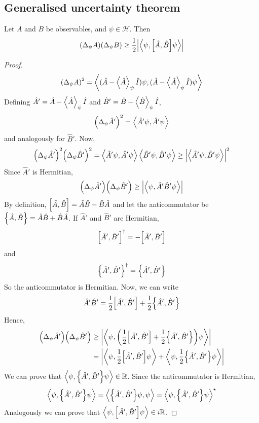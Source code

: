 \subsection{Generalised uncertainty theorem}
\begin{theorem}
	Let \( A \) and \( B \) be observables, and \( \psi \in \mathcal H \).
	Then
	\[
		\qty(\Delta_\psi A)\qty(\Delta_\psi B) \geq \frac{1}{2} \abs{\left\langle{\psi, \qty[\hat A, \hat B]\psi}\right\rangle}
	\]
\end{theorem}
\begin{proof}
	\[
		\qty(\Delta_\psi A)^2 = \left\langle{(\hat A - \left\langle{\hat A}\right\rangle_\psi \hat I) \psi, (\hat A - \left\langle{\hat A}\right\rangle_\psi \hat I) \psi}\right\rangle
	\]
	Defining \( \hat A' = \hat A - \left\langle{\hat A}\right\rangle_\psi \hat I \) and \( \hat B' = \hat B - \left\langle{\hat B}\right\rangle_\psi \hat I \),
	\[
		\qty(\Delta_\psi \hat A')^2 = \left\langle{\hat A' \psi, \hat A' \psi}\right\rangle
	\]
	and analogously for \( \hat B' \).
	Now,
	\[
		\qty(\Delta_\psi \hat A')^2 \qty(\Delta_\psi \hat B')^2 = \left\langle{\hat A' \psi, \hat A' \psi}\right\rangle \left\langle{\hat B' \psi, \hat B' \psi}\right\rangle \geq \abs{\left\langle{\hat A' \psi, \hat B' \psi}\right\rangle}^2
	\]
	Since \( \hat A' \) is Hermitian,
	\[
		\qty(\Delta_\psi \hat A') \qty(\Delta_\psi \hat B') \geq \abs{\left\langle{\psi, \hat A' \hat B' \psi}\right\rangle}
	\]
	By definition, \( \qty[\hat A, \hat B] = \hat A \hat B - \hat B \hat A \) and let the anticommutator be \( \qty{\hat A, \hat B} = \hat A \hat B + \hat B \hat A \).
	If \( \hat A' \) and \( \hat B' \) are Hermitian,
	\[
		\qty[\hat A', \hat B']^\dagger = - \qty[\hat A', \hat B']
	\]
	and
	\[
		\qty{\hat A', \hat B'}^\dagger = \qty{\hat A', \hat B'}
	\]
	So the anticommutator is Hermitian.
	Now, we can write
	\[
		\hat A' \hat B' = \frac{1}{2} \qty[\hat A', \hat B'] + \frac{1}{2} \qty{\hat A', \hat B'}
	\]
	Hence,
	\begin{align*}
		\qty(\Delta_\psi \hat A') \qty(\Delta_\psi \hat B') & \geq \abs{\left\langle{\psi, \qty(\frac{1}{2} \qty[\hat A', \hat B'] + \frac{1}{2} \qty{\hat A', \hat B'}) \psi}\right\rangle}           \\
		                                                    & = \abs{\left\langle{\psi, \frac{1}{2} \qty[\hat A', \hat B'] \psi}\right\rangle + \left\langle{\psi, \frac{1}{2} \qty{\hat A', \hat B'} \psi}\right\rangle}
	\end{align*}
	We can prove that \( \left\langle{\psi, \qty{\hat A', \hat B'} \psi}\right\rangle \in \mathbb R \).
	Since the anticommutator is Hermitian,
	\[
		\left\langle{\psi, \qty{\hat A', \hat B'} \psi}\right\rangle = \left\langle{\qty{\hat A', \hat B'} \psi, \psi}\right\rangle = \left\langle{\psi, \qty{\hat A', \hat B'} \psi}\right\rangle^\star
	\]
	Analogously we can prove that \( \left\langle{\psi, \qty[\hat A', \hat B'] \psi}\right\rangle \in i\mathbb R \).

\end{proof}
